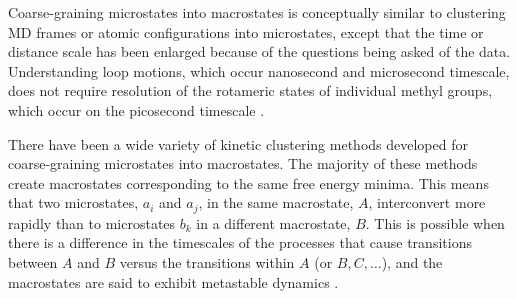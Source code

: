Coarse-graining microstates into macrostates is conceptually similar to clustering MD frames or atomic configurations into microstates, except that the time or distance scale has been enlarged because of the questions being asked of the data. Understanding loop motions, which occur nanosecond and microsecond timescale, does not require resolution of the rotameric states of individual methyl groups, which occur on the picosecond timescale \cite{henzler-wildmanDynamicPersonalitiesProteins2007}.


There have been a wide variety of kinetic clustering methods developed for coarse-graining microstates into macrostates. The majority of these methods create macrostates corresponding to the same free energy minima. This means that two microstates, $a_{i}$ and $a_{j}$, in the same macrostate, $A$, interconvert more rapidly than to microstates $b_{k}$ in a different macrostate, $B$.  This is possible when there is a difference in the timescales of the processes that cause transitions between $A$ and $B$ versus the transitions within $A$ (or $B, C, \ldots$), and the macrostates are said to exhibit metastable dynamics \cite{noeProjectedHiddenMarkov2013a}.  

